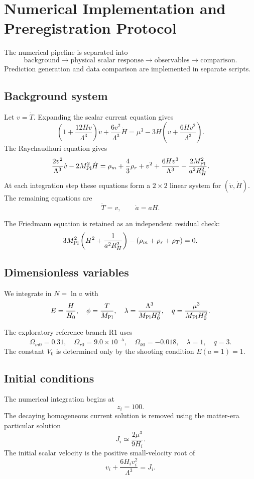 ﻿\section{Numerical Implementation and Preregistration Protocol}

The numerical pipeline is separated into
\[
\boxed{
\text{background}
\rightarrow
\text{physical scalar response}
\rightarrow
\text{observables}
\rightarrow
\text{comparison}.
}
\]
Prediction generation and data comparison are implemented in separate scripts.

\subsection{Background system}

Let \(v=\dot T\). Expanding the scalar current equation gives
\[
\left(1+\frac{12Hv}{\Lambda^3}\right)\dot v
+
\frac{6v^2}{\Lambda^3}\dot H
=
\mu^3-3H\left(v+\frac{6Hv^2}{\Lambda^3}\right).
\]
The Raychaudhuri equation gives
\[
\frac{2v^2}{\Lambda^3}\dot v
-
2M_{\rm Pl}^2\dot H
=
\rho_m+\frac43\rho_r+v^2+\frac{6Hv^3}{\Lambda^3}
-\frac{2M_{\rm Pl}^2}{a^2R_H^2}.
\]
At each integration step these equations form a \(2\times2\) linear system for \((\dot v,\dot H)\). The remaining equations are
\[
\dot T=v,\qquad
\dot a=aH.
\]

The Friedmann equation is retained as an independent residual check:
\[
3M_{\rm Pl}^2
\left(H^2+\frac{1}{a^2R_H^2}\right)
-
(\rho_m+\rho_r+\rho_T)
=0.
\]

\subsection{Dimensionless variables}

We integrate in \(N=\ln a\) with
\[
E=\frac{H}{H_0},
\quad
\phi=\frac{T}{M_{\rm Pl}},
\quad
\lambda=\frac{\Lambda^3}{M_{\rm Pl}H_0^2},
\quad
q=\frac{\mu^3}{M_{\rm Pl}H_0^2}.
\]

The exploratory reference branch R1 uses
\[
\Omega_{m0}=0.31,\quad
\Omega_{r0}=9.0\times10^{-5},\quad
\Omega_{k0}=-0.018,\quad
\lambda=1,\quad q=3.
\]
The constant \(V_0\) is determined only by the shooting condition \(E(a=1)=1\).

\subsection{Initial conditions}

The numerical integration begins at
\[
z_i=100.
\]
The decaying homogeneous current solution is removed using the matter-era particular solution
\[
J_i\simeq\frac{2\mu^3}{9H_i}.
\]
The initial scalar velocity is the positive small-velocity root of
\[
v_i+\frac{6H_iv_i^2}{\Lambda^3}=J_i.
\]

